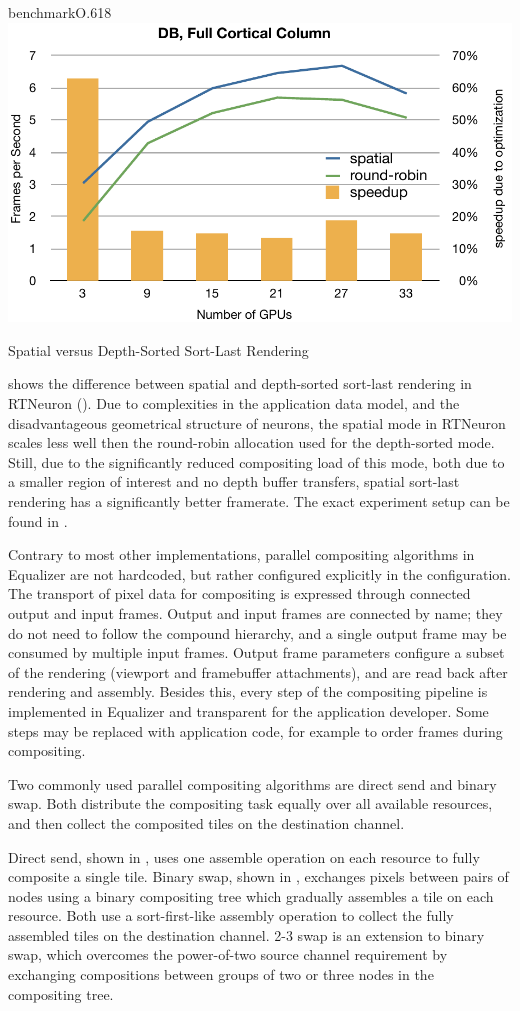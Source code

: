 \begin{wrapfloat}{benchmark}{O}{.618\textwidth}
 \includegraphics[width=.618\textwidth]{results/dbSpatial}
 {\caption{\label{rDBSpatial}Spatial versus Depth-Sorted Sort-Last Rendering}}
\end{wrapfloat}

 shows the difference between spatial and depth-sorted
sort-last rendering in RTNeuron (). Due to complexities in the
application data model, and the disadvantageous geometrical structure of
neurons, the spatial mode in RTNeuron scales less well then the round-robin
allocation used for the depth-sorted mode. Still, due to the significantly
reduced compositing load of this mode, both due to a smaller region of interest
and no depth buffer transfers, spatial sort-last rendering has a significantly
better framerate. The exact experiment setup can be found in \cite{EBAHMP:12}.

Contrary to most other implementations, parallel compositing algorithms in
Equalizer are not hardcoded, but rather configured explicitly in the
configuration. The transport of pixel data for compositing is expressed through
connected output and input frames. Output and input frames are connected by
name; they do not need to follow the compound hierarchy, and a single output
frame may be consumed by multiple input frames. Output frame parameters
configure a subset of the rendering (viewport and framebuffer attachments), and
are read back after rendering and assembly. Besides this, every step of the
compositing pipeline is implemented in Equalizer and transparent for the
application developer. Some steps may be replaced with application code, for
example to order frames during compositing.

Two commonly used parallel compositing algorithms are direct send and binary
swap. Both distribute the compositing task equally over all available
resources, and then collect the composited tiles on the destination channel.

Direct send, shown in , uses one assemble operation on each
resource to fully composite a single tile. Binary swap, shown in ,
exchanges pixels between pairs of nodes using a binary compositing tree which
gradually assembles a tile on each resource. Both use a sort-first-like
assembly operation to collect the fully assembled tiles on the destination
channel. 2-3 swap \cite{Yu:2008:MPV:1413370.1413419} is an extension to binary
swap, which overcomes the power-of-two source channel requirement by exchanging
compositions between groups of two or three nodes in the compositing tree.

